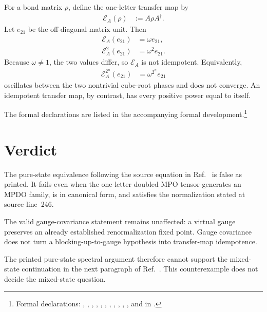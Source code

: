 \documentclass{article}
\begin{document}
For a bond matrix $\rho$, define the one-letter transfer map by
\begin{align}
    \mathcal E_A(\rho)
        &:= A\rho A^\dagger.
    \label{eq:cpsv16_rfp_gauge_pure_equivalence_false_transfer_definition}
\end{align}
Let $e_{21}$ be the off-diagonal matrix unit. Then
\begin{align}
    \mathcal E_A(e_{21})
        &= \omega e_{21},
    \label{eq:cpsv16_rfp_gauge_pure_equivalence_false_first_transfer_action}\\
    \mathcal E_A^2(e_{21})
        &= \omega^2 e_{21}.
    \label{eq:cpsv16_rfp_gauge_pure_equivalence_false_second_transfer_action}
\end{align}
Because $\omega\ne 1$, the two values differ, so $\mathcal E_A$ is not
idempotent. Equivalently,
\begin{align}
    \mathcal E_A^{2^n}(e_{21})
        &=
        \omega^{2^n}e_{21}
    \label{eq:cpsv16_rfp_gauge_pure_equivalence_false_dyadic_oscillation}
\end{align}
oscillates between the two nontrivial cube-root phases and does not converge.
An idempotent transfer map, by contrast, has every positive power equal to
itself.

The formal declarations are listed in the accompanying formal
development.\footnote{Formal declarations:
,
,
,
,
,
,
,
,
,
,
, and
 in
.}

\section{Verdict}

The pure-state equivalence following the source equation  in
Ref.~\cite{Cirac2016MPDO_arXiv} is false as printed. It fails even when the
one-letter doubled MPO tensor generates an MPDO family, is in canonical form,
and satisfies the normalization stated at source line~246.

The valid gauge-covariance statement remains unaffected: a virtual gauge
preserves an already established renormalization fixed point. Gauge covariance
does not turn a blocking-up-to-gauge hypothesis into transfer-map
idempotence.

The printed pure-state spectral argument therefore cannot support the
mixed-state continuation in the next paragraph of
Ref.~\cite{Cirac2016MPDO_arXiv}. This counterexample does not decide the
mixed-state question.



\end{document}
